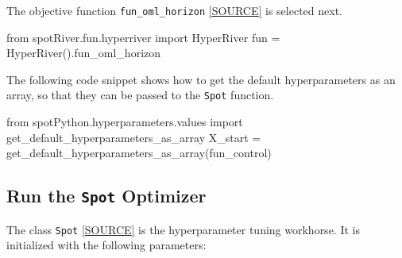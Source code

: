 \documentclass[
  letterpaper,
  DIV=11,
  numbers=noendperiod]{scrreprt}
\newenvironment{Shaded}{\begin{snugshade}}{\end{snugshade}}
\newcommand{\ImportTok}[1]{\textcolor[rgb]{0.00,0.46,0.62}{#1}}
\newcommand{\NormalTok}[1]{\textcolor[rgb]{0.00,0.23,0.31}{#1}}
\newcommand{\OperatorTok}[1]{\textcolor[rgb]{0.37,0.37,0.37}{#1}}
\begin{document}
The objective function \texttt{fun\_oml\_horizon}
\href{https://github.com/sequential-parameter-optimization/spotRiver/blob/main/src/spotRiver/fun/hyperriver.py}{{[}SOURCE{]}}
is selected next.

\begin{Shaded}
\begin{Highlighting}[]
\ImportTok{from}\NormalTok{ spotRiver.fun.hyperriver }\ImportTok{import}\NormalTok{ HyperRiver}
\NormalTok{fun }\OperatorTok{=}\NormalTok{ HyperRiver().fun\_oml\_horizon}
\end{Highlighting}
\end{Shaded}

The following code snippet shows how to get the default hyperparameters
as an array, so that they can be passed to the \texttt{Spot} function.

\begin{Shaded}
\begin{Highlighting}[]
\ImportTok{from}\NormalTok{ spotPython.hyperparameters.values }\ImportTok{import}\NormalTok{ get\_default\_hyperparameters\_as\_array}
\NormalTok{X\_start }\OperatorTok{=}\NormalTok{ get\_default\_hyperparameters\_as\_array(fun\_control)}
\end{Highlighting}
\end{Shaded}

\hypertarget{run-the-spot-optimizer-6}{%
\subsection{\texorpdfstring{Run the \texttt{Spot}
Optimizer}{Run the Spot Optimizer}}\label{run-the-spot-optimizer-6}}

The class \texttt{Spot}
\href{https://github.com/sequential-parameter-optimization/spotPython/blob/main/src/spotPython/spot/spot.py}{{[}SOURCE{]}}
is the hyperparameter tuning workhorse. It is initialized with the
following parameters:
\end{document}
